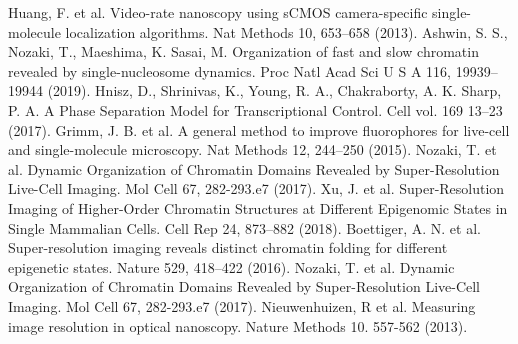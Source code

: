 \documentclass{ucetd}
\begin{document}
\newline
\noindent [27] Huang, F. et al. Video-rate nanoscopy using sCMOS camera-specific single-molecule localization algorithms. Nat Methods 10, 653–658 (2013). 
\newline
\noindent [28] Ashwin, S. S., Nozaki, T., Maeshima, K. Sasai, M. Organization of fast and slow chromatin revealed by single-nucleosome dynamics. Proc Natl Acad Sci U S A 116, 19939–19944 (2019). 
\newline
\noindent [29] Hnisz, D., Shrinivas, K., Young, R. A., Chakraborty, A. K. Sharp, P. A. A Phase Separation Model for Transcriptional Control. Cell vol. 169 13–23 (2017). 
\newline
\noindent [30] Grimm, J. B. et al. A general method to improve fluorophores for live-cell and single-molecule microscopy. Nat Methods 12, 244–250 (2015). 
\newline
\noindent [31] Nozaki, T. et al. Dynamic Organization of Chromatin Domains Revealed by Super-Resolution Live-Cell Imaging. Mol Cell 67, 282-293.e7 (2017). 
\newline
\noindent [32] Xu, J. et al. Super-Resolution Imaging of Higher-Order Chromatin Structures at Different Epigenomic States in Single Mammalian Cells. Cell Rep 24, 873–882 (2018). 
\newline
\noindent [33] Boettiger, A. N. et al. Super-resolution imaging reveals distinct chromatin folding for different epigenetic states. Nature 529, 418–422 (2016). 
\newline
\noindent [34] Nozaki, T. et al. Dynamic Organization of Chromatin Domains Revealed by Super-Resolution Live-Cell Imaging. Mol Cell 67, 282-293.e7 (2017). 
\noindent [35] Nieuwenhuizen, R et al. Measuring image resolution in optical nanoscopy. Nature Methods 10. 557-562 (2013). 
\end{document}
